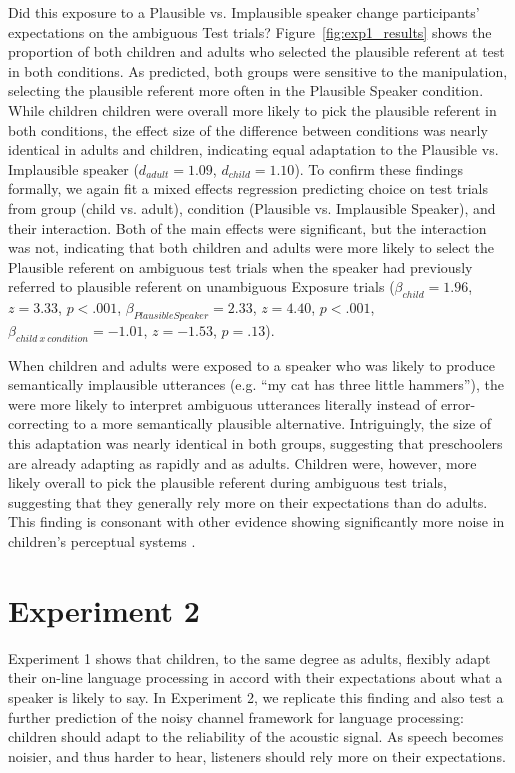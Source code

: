 \documentclass[man,floatsintext]{apa6}
\begin{document}
Did this exposure to a Plausible vs. Implausible speaker change participants' expectations on the ambiguous Test trials? Figure~\ref{fig:exp1_results} shows the proportion of both children and adults who selected the plausible referent at test in both conditions. As predicted, both groups were sensitive to the manipulation, selecting the plausible referent more often in the Plausible Speaker condition. While children children were overall more likely to pick the plausible referent in both conditions, the effect size of the difference between conditions was nearly identical in adults and children, indicating equal adaptation to the Plausible vs. Implausible speaker ($d_{adult} =1.09$, $d_{child} = 1.10$). To confirm these findings formally, we again fit a mixed effects regression predicting choice on test trials from group (child vs. adult), condition (Plausible vs. Implausible Speaker), and their interaction. Both of the main effects were significant, but the interaction was not, indicating that both children and adults were more likely to select the Plausible referent on ambiguous test trials when the speaker had previously referred to plausible referent on unambiguous Exposure trials ($\beta_{child} = 1.96$,  $z = 3.33$, $p <.001$, $\beta_{Plausible Speaker} = 2.33$,  $z = 4.40$, $p <.001$,  $\beta_{child \: x \: condition} = -1.01$,  $z = -1.53$, $p = .13$).

When children and adults were exposed to a speaker who was likely to produce semantically implausible utterances (e.g. ``my cat has three little hammers''), the were more likely to interpret ambiguous utterances literally instead of error-correcting to a more semantically plausible alternative. Intriguingly, the size of this adaptation was nearly identical in both groups, suggesting that preschoolers are already adapting as rapidly and as adults. Children were, however, more likely overall to pick the plausible referent during ambiguous test trials, suggesting that they generally rely more on their expectations than do adults. This finding is consonant with other evidence showing significantly more noise in children's perceptual systems \cite{neuman1983}.

\section{Experiment 2}

Experiment 1 shows that children, to the same degree as adults, flexibly adapt their on-line language processing in accord with their expectations about what a speaker is likely to say. In Experiment 2, we replicate this finding and also test a further prediction of the noisy channel framework for language processing: children should adapt to the reliability of the acoustic signal. As speech becomes noisier, and thus harder to hear, listeners should rely more on their expectations. 
\end{document}
